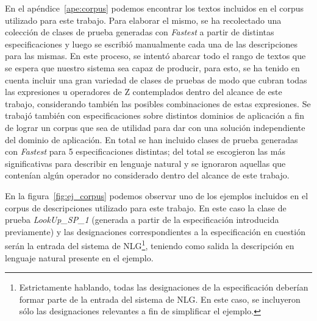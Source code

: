 En el apéndice~\ref{ape:corpus} podemos encontrar los textos incluidos en el corpus utilizado para este trabajo. Para elaborar el mismo, se ha recolectado una colección de clases de prueba generadas con \emph{Fastest} a partir de distintas especificaciones y luego se escribió manualmente cada una de las descripciones para las mismas. En este proceso, se intentó abarcar todo el rango de textos que se espera que nuestro sistema sea capaz de producir, para esto, se ha tenido en cuenta incluir una gran variedad de clases de pruebas de modo que cubran todas las expresiones u operadores de Z contemplados dentro del alcance de este trabajo, considerando también las posibles combinaciones de estas expresiones. Se trabajó también con especificaciones sobre distintos dominios de aplicación a fin de lograr un corpus que sea de utilidad para dar con una solución independiente del dominio de aplicación. En total se han incluido clases de prueba generadas con \emph{Fastest} para 5 especificaciones distintas; del total se escogieron las más significativas para describir en lenguaje natural y se ignoraron aquellas que contenían algún operador no considerado dentro del alcance de este trabajo.


En la figura~\ref{fig:ej_corpus} podemos observar uno de los ejemplos incluidos en el corpus de descripciones utilizado para este trabajo. En este caso la clase de prueba \emph{LookUp\_SP\_1} (generada a partir de la especificación introducida previamente) y las designaciones correspondientes a la especificación en cuestión serán la entrada del sistema de NLG\footnote{Estrictamente hablando, todas las designaciones de la especificación deberían formar parte de la entrada del sistema de NLG. En este caso, se incluyeron sólo las designaciones relevantes a fin de simplificar el ejemplo.}, teniendo como salida la descripción en lenguaje natural presente en el ejemplo.

